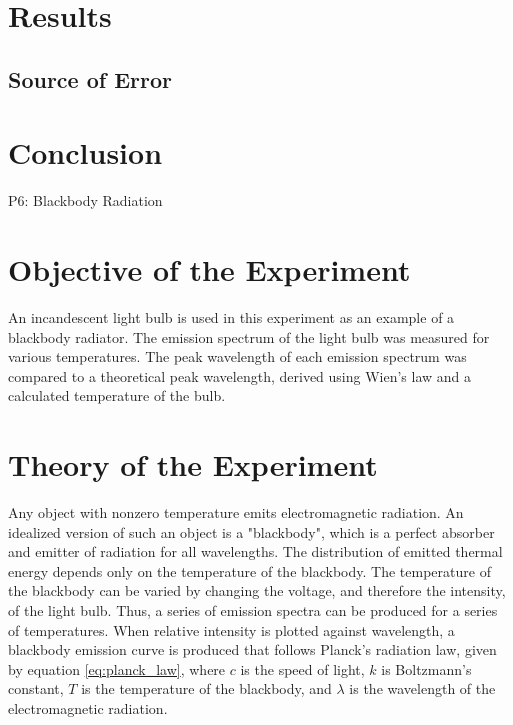 \documentclass[a4paper]{article}
\begin{document}

\section{Results}


\subsection{Source of Error}

\qq 

\section{Conclusion}

\newpage

P6: Blackbody Radiation

\newpage

\section{Objective of the Experiment}
\qq An incandescent light bulb is used in this experiment as an example of a blackbody radiator. The emission spectrum of the light bulb was measured for various temperatures. The peak wavelength of each emission spectrum was compared to a theoretical peak wavelength, derived using Wien's law and a calculated temperature of the bulb.

\section{Theory of the Experiment}

\qq Any object with nonzero temperature emits electromagnetic radiation. An idealized version of such an object is a "blackbody", which is a perfect absorber and emitter of radiation for all wavelengths. The distribution of emitted thermal energy depends only on the temperature of the blackbody. The temperature of the blackbody can be varied by changing the voltage, and therefore the intensity, of the light bulb. Thus, a series of emission spectra can be produced for a series of temperatures. When relative intensity is plotted against wavelength, a blackbody emission curve is produced that follows Planck's radiation law, given by equation \ref{eq:planck_law}, where $c$ is the speed of light, $k$ is Boltzmann's constant, $T$ is the temperature of the blackbody, and $\lambda$ is the wavelength of the electromagnetic radiation.
\end{document}
